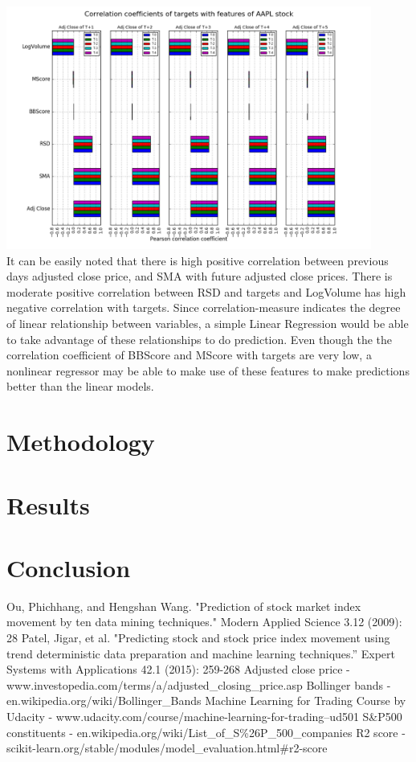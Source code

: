 \documentclass[10pt]{report}
\begin{document}
\includegraphics[width=12cm]{plots/corrcoeffs.png}\\
It can be easily noted that there is high positive correlation between previous days adjusted close price, and SMA with future adjusted close prices. There is moderate positive correlation between RSD and targets and LogVolume has high negative correlation with targets. Since correlation-measure indicates the degree of linear relationship between variables, a simple Linear Regression would be able to take advantage of these relationships to do prediction. Even though the the correlation coefficient of BBScore and MScore with targets are very low, a nonlinear regressor may be able to make use of these features to make predictions better than the linear models.

\section{Methodology}

\section{Results}

\section{Conclusion}

\begin{thebibliography}{}

Ou, Phichhang, and Hengshan Wang. "Prediction of stock market index movement by ten data mining techniques." Modern Applied Science 3.12 (2009): 28
Patel, Jigar, et al. "Predicting stock and stock price index movement using trend deterministic data preparation and machine learning techniques.” Expert Systems with Applications 42.1 (2015): 259-268
Adjusted close price - www.investopedia.com/terms/a/adjusted\_closing\_price.asp
Bollinger bands - en.wikipedia.org/wiki/Bollinger\_Bands
Machine Learning for Trading Course by Udacity - www.udacity.com/course/machine-learning-for-trading--ud501
S\&P500 constituents - en.wikipedia.org/wiki/List\_of\_S\%26P\_500\_companies
R2 score - scikit-learn.org/stable/modules/model\_evaluation.html\#r2-score

\end{thebibliography}
\end{document}
